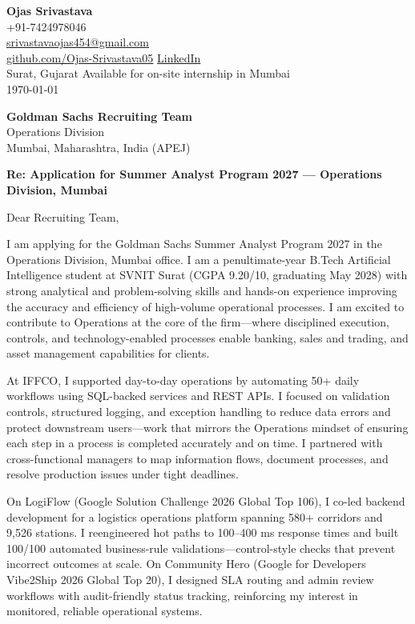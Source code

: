\documentclass[a4paper,11pt]{article}
\begin{document}
\begin{flushright}
\textbf{Ojas Srivastava} \\
+91-7424978046 \\
\href{mailto:srivastavaojas454@gmail.com}{srivastavaojas454@gmail.com} \\
\href{https://github.com/Ojas-Srivastava05}{github.com/Ojas-Srivastava05} \textbar{}
\href{https://linkedin.com/in/ojas-srivastava05}{LinkedIn} \\
Surat, Gujarat \textbar{} Available for on-site internship in Mumbai \\
\today
\end{flushright}

\vspace{4mm}
\textbf{Goldman Sachs Recruiting Team} \\
Operations Division \\
Mumbai, Maharashtra, India (APEJ)

\vspace{2mm}
\textbf{Re: Application for Summer Analyst Program 2027 --- Operations Division, Mumbai}

Dear Recruiting Team,

I am applying for the Goldman Sachs Summer Analyst Program 2027 in the Operations Division, Mumbai office. I am a penultimate-year B.Tech Artificial Intelligence student at SVNIT Surat (CGPA 9.20/10, graduating May 2028) with strong analytical and problem-solving skills and hands-on experience improving the accuracy and efficiency of high-volume operational processes. I am excited to contribute to Operations at the core of the firm---where disciplined execution, controls, and technology-enabled processes enable banking, sales and trading, and asset management capabilities for clients.

At IFFCO, I supported day-to-day operations by automating 50+ daily workflows using SQL-backed services and REST APIs. I focused on validation controls, structured logging, and exception handling to reduce data errors and protect downstream users---work that mirrors the Operations mindset of ensuring each step in a process is completed accurately and on time. I partnered with cross-functional managers to map information flows, document processes, and resolve production issues under tight deadlines.

On LogiFlow (Google Solution Challenge 2026 Global Top 106), I co-led backend development for a logistics operations platform spanning 580+ corridors and 9,526 stations. I reengineered hot paths to 100--400 ms response times and built 100/100 automated business-rule validations---control-style checks that prevent incorrect outcomes at scale. On Community Hero (Google for Developers Vibe2Ship 2026 Global Top 20), I designed SLA routing and admin review workflows with audit-friendly status tracking, reinforcing my interest in monitored, reliable operational systems.
\end{document}
